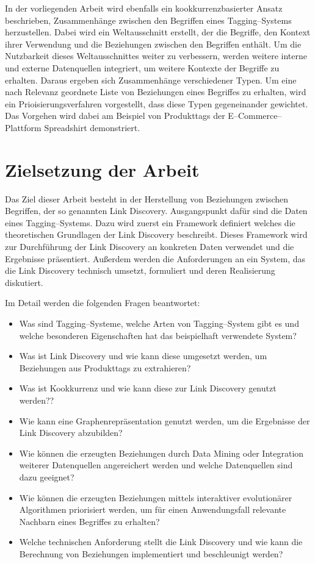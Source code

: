 In der vorliegenden Arbeit wird ebenfalls ein kookkurrenzbasierter Ansatz beschrieben, Zusammenhänge zwischen den Begriffen eines Tagging--Systems herzustellen. Dabei wird ein Weltausschnitt erstellt, der die Begriffe, den Kontext ihrer Verwendung und die Beziehungen zwischen den Begriffen enthält. Um die Nutzbarkeit dieses Weltausschnittes weiter zu verbessern, werden weitere interne und externe Datenquellen integriert, um weitere Kontexte der Begriffe zu erhalten. Daraus ergeben sich Zusammenhänge verschiedener Typen. Um eine nach Relevanz geordnete Liste von Beziehungen eines Begriffes zu erhalten, wird ein Prioisierungsverfahren vorgestellt, dass diese Typen gegeneinander gewichtet. Das Vorgehen wird dabei am Beispiel von Produkttags der E--Commerce--Plattform Spreadshirt demonstriert.

\section{Zielsetzung der Arbeit}

Das Ziel dieser Arbeit besteht in der Herstellung von Beziehungen zwischen Begriffen, der so genannten Link Discovery. Ausgangspunkt dafür sind die Daten eines Tagging--Systems. Dazu wird zuerst ein Framework definiert welches die theoretischen Grundlagen der Link Discovery beschreibt. Dieses Framework wird zur Durchführung der Link Discovery an konkreten Daten verwendet und die Ergebnisse präsentiert. Außerdem werden die Anforderungen an ein System, das die Link Discovery technisch umsetzt, formuliert und deren Realisierung diskutiert.

Im Detail werden die folgenden Fragen beantwortet:

\begin{itemize}
    \item Was sind Tagging--Systeme, welche Arten von Tagging--System gibt es und welche besonderen Eigenschaften hat das beispielhaft verwendete System?
    \item Was ist Link Discovery und wie kann diese umgesetzt werden, um Beziehungen aus Produkttags zu extrahieren?
    \item Was ist Kookkurrenz und wie kann diese zur Link Discovery genutzt werden?? 
    \item Wie kann eine Graphenrepräsentation genutzt werden, um die Ergebnisse der Link Discovery abzubilden?
    \item Wie können die erzeugten Beziehungen durch Data Mining oder Integration weiterer Datenquellen angereichert werden und welche Datenquellen sind dazu geeignet?
    \item Wie können die erzeugten Beziehungen mittels interaktiver evolutionärer Algorithmen priorisiert werden, um für einen Anwendungsfall relevante Nachbarn eines Begriffes zu erhalten?
    \item Welche technischen Anforderung stellt die Link Discovery und wie kann die Berechnung von Beziehungen implementiert und beschleunigt werden?
\end{itemize}

